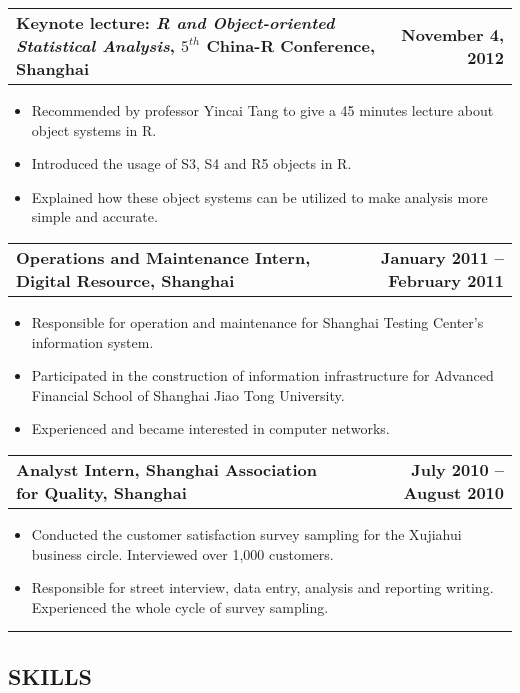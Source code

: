\documentclass[10pt]{article}
\makeatletter
\newcommand{\headerrow}[2]
{\begin{tabular*}{\linewidth}{l@{\extracolsep{\fill}}r}
	#1 &
	#2 \\
\end{tabular*}}
\makeatother
\begin{document}
\noindent\headerrow
	{\textbf{Keynote lecture: \emph{R and Object-oriented Statistical Analysis}, $5^{th}$ China-R Conference, Shanghai}}
	{\textbf{November 4, 2012}}
\begin{itemize}[topsep=2pt, itemsep=-2pt]
    \setlength{\itemsep}{-2pt}
	\item Recommended by professor Yincai Tang to give a 45 minutes lecture about object systems in R.
	\item Introduced the usage of S3, S4 and R5 objects in R.
	\item Explained how these object systems can be utilized to make analysis more simple and accurate.
\end{itemize}

\noindent\headerrow
	{\textbf{Operations and Maintenance Intern, Digital Resource, Shanghai}}
	{\textbf{January 2011 – February 2011}}
\begin{itemize}[topsep=2pt, itemsep=-2pt]
    \setlength{\itemsep}{-2pt}
	\item Responsible for operation and maintenance for Shanghai Testing Center's information system. 
	\item Participated in the construction of information infrastructure for Advanced Financial School of Shanghai Jiao Tong University. 
	\item Experienced and became interested in computer networks.
\end{itemize}

\noindent\headerrow
	{\textbf{Analyst Intern, Shanghai Association for Quality, Shanghai}}
	{\textbf{July 2010 – August 2010}}
\begin{itemize}[topsep=2pt, itemsep=-2pt]
	\item Conducted the customer satisfaction survey sampling for the Xujiahui business circle. Interviewed over 1,000 customers. 
	\item Responsible for street interview, data entry, analysis and reporting writing. Experienced the whole cycle of survey sampling.
\end{itemize}

\vspace{0.2em}
\hrule
\vspace{-1em}

\subsection*{\centering SKILLS}
\end{document}

